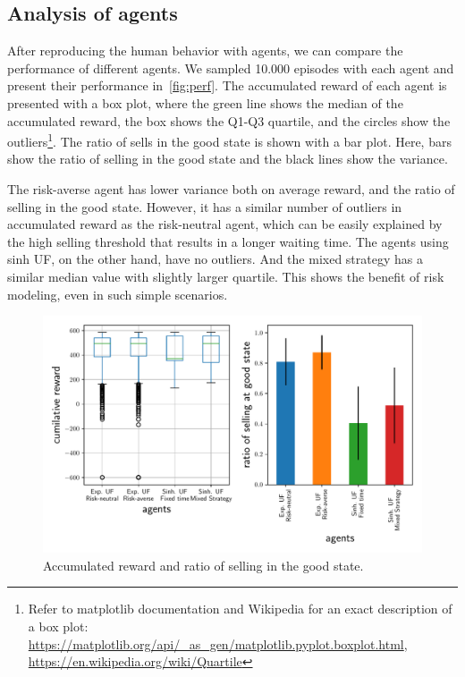 \subsection{Analysis of agents}
After reproducing the human behavior with agents, we can compare the performance of different agents.
We sampled 10.000 episodes with each agent and present their performance in~\autoref{fig:perf}. The accumulated reward of each agent is presented with a box plot, where the green line shows the median of the accumulated reward, the box shows the Q1-Q3 quartile, and the circles show the outliers\footnote{Refer to matplotlib documentation and Wikipedia for an exact description of a box plot: \url{https://matplotlib.org/api/_as_gen/matplotlib.pyplot.boxplot.html}, \url{https://en.wikipedia.org/wiki/Quartile}}.
The ratio of sells in the good state is shown with a bar plot.
Here, bars show the ratio of selling in the good state and the black lines show the variance.

The risk-averse agent has lower variance both on average reward, and the ratio of selling in the good state. However, it has a similar number of outliers in accumulated reward as the risk-neutral agent, which can be easily explained by the high selling threshold that results in a longer waiting time. The agents using sinh UF, on the other hand, have no outliers. And the mixed strategy has a similar median value with slightly larger quartile.
This shows the benefit of risk modeling, even in such simple scenarios.

\begin{figure}[h]
    \centering
    \includegraphics[width=0.99\linewidth]{img/performance.pdf}
    \caption{Accumulated reward and ratio of selling in the good state.}\label{fig:perf}
\end{figure}
